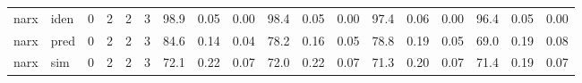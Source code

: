 \begin{landscape}
\begin{center}
\begin{longtable}{ll|cccc|ccc|ccc|ccc|ccc}
 \hline 
narx & iden & 0 & 2 & 2 & 3 & 98.9 & 0.05 & 0.00 & 98.4 & 0.05 & 0.00 & 97.4 & 0.06 & 0.00 & 96.4 & 0.05 & 0.00 \\ 
narx & pred & 0 & 2 & 2 & 3 & 84.6 & 0.14 & 0.04 & 78.2 & 0.16 & 0.05 & 78.8 & 0.19 & 0.05 & 69.0 & 0.19 & 0.08 \\ 
narx & sim  & 0 & 2 & 2 & 3 & 72.1 & 0.22 & 0.07 & 72.0 & 0.22 & 0.07 & 71.3 & 0.20 & 0.07 & 71.4 & 0.19 & 0.07 \\ 
 \hline 
\end{longtable} 
\normalsize \end{center} 
 \end{landscape}